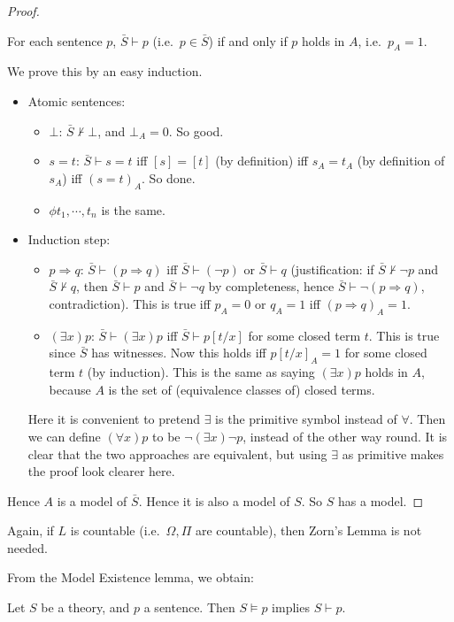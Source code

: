 \documentclass[a4paper]{article}
\begin{document}
\begin{proof}
  \begin{claim}
    For each sentence $p$, $\bar S\vdash p$ (i.e.\ $p\in \bar S$) if and only if $p$ holds in $A$, i.e.\ $p_A = 1$.
  \end{claim}
  We prove this by an easy induction.
  \begin{itemize}
    \item Atomic sentences:
      \begin{itemize}
        \item $\bot$: $\bar S \not\vdash \bot$, and $\bot_A = 0$. So good.
        \item $s = t$: $\bar S \vdash s = t$ iff $[s] = [t]$ (by definition) iff $s_A = t_A$ (by definition of $s_A$) iff $(s = t)_A$. So done.
        \item $\phi t_1, \cdots, t_n$ is the same.
      \end{itemize}
    \item Induction step:
      \begin{itemize}
        \item $p\Rightarrow q$: $\bar S\vdash (p \Rightarrow q)$ iff $\bar S \vdash (\neg p)$ or $\bar S\vdash q$ (justification: if $\bar S \not\vdash \neg p$ and $\bar S\not\vdash q$, then $\bar S\vdash p$ and $\bar S \vdash \neg q$ by completeness, hence $\bar S\vdash \neg(p\Rightarrow q)$, contradiction). This is true iff $p_A = 0$ or $q_A = 1$ iff $(p\Rightarrow q)_A = 1$.
        \item $(\exists x)p$: $\bar S \vdash (\exists x)p$ iff $\bar S\vdash p[t/x]$ for some closed term $t$. This is true since $\bar S$ has witnesses. Now this holds iff $p[t/x]_A = 1$ for some closed term $t$ (by induction). This is the same as saying $(\exists x)p$ holds in $A$, because $A$ is the set of (equivalence classes of) closed terms.
      \end{itemize}
      Here it is convenient to pretend $\exists$ is the primitive symbol instead of $\forall$. Then we can define $(\forall x) p$ to be $\neg (\exists x)\neg p$, instead of the other way round. It is clear that the two approaches are equivalent, but using $\exists $ as primitive makes the proof look clearer here.
  \end{itemize}
  Hence $A$ is a model of $\bar S$. Hence it is also a model of $S$. So $S$ has a model.
\end{proof}
Again, if $L$ is countable (i.e.\ $\Omega, \Pi$ are countable), then Zorn's Lemma is not needed.

From the Model Existence lemma, we obtain:
\begin{cor}
  Let $S$ be a theory, and $p$ a sentence. Then $S\models p$ implies $S\vdash p$.
\end{cor}
\end{document}

